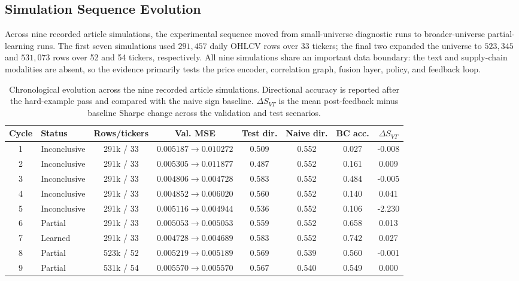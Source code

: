 \documentclass[10pt]{article}
\begin{document}
\subsection{Simulation Sequence Evolution}

Across nine recorded article simulations, the experimental sequence moved from small-universe
diagnostic runs to broader-universe partial-learning runs. The first seven simulations used
\(291{,}457\) daily OHLCV rows over 33 tickers; the final two expanded the universe to
\(523{,}345\) and \(531{,}073\) rows over 52 and 54 tickers, respectively. All nine
simulations share an important data boundary: the text and supply-chain modalities are absent,
so the evidence primarily tests the price encoder, correlation graph, fusion layer, policy,
and feedback loop.

\begin{table}[htbp]
	\centering
	\scriptsize
	\caption{Chronological evolution across the nine recorded article simulations. Directional
		accuracy is reported after the hard-example pass and compared with the naive sign baseline.
		\(\Delta S_{VT}\) is the mean post-feedback minus baseline Sharpe change across the validation
		and test scenarios.}
	\label{tab:simulation-evolution}
	\begin{tabular}{clcccccc}
		\toprule
		Cycle & Status & Rows/tickers & Val. MSE & Test dir. & Naive dir. & BC acc. & \(\Delta S_{VT}\) \\
		\midrule
		1 & Inconclusive & 291k / 33 & \(0.005187\to0.010272\) & 0.509 & 0.552 & 0.027 & -0.008 \\
		2 & Inconclusive & 291k / 33 & \(0.005305\to0.011877\) & 0.487 & 0.552 & 0.161 &  0.009 \\
		3 & Inconclusive & 291k / 33 & \(0.004806\to0.004728\) & 0.583 & 0.552 & 0.484 & -0.005 \\
		4 & Inconclusive & 291k / 33 & \(0.004852\to0.006020\) & 0.560 & 0.552 & 0.140 &  0.041 \\
		5 & Inconclusive & 291k / 33 & \(0.005116\to0.004944\) & 0.536 & 0.552 & 0.106 & -2.230 \\
		6 & Partial      & 291k / 33 & \(0.005053\to0.005053\) & 0.559 & 0.552 & 0.658 &  0.013 \\
		7 & Learned      & 291k / 33 & \(0.004728\to0.004689\) & 0.583 & 0.552 & 0.742 &  0.027 \\
		8 & Partial      & 523k / 52 & \(0.005219\to0.005189\) & 0.569 & 0.539 & 0.560 & -0.001 \\
		9 & Partial      & 531k / 54 & \(0.005570\to0.005570\) & 0.567 & 0.540 & 0.549 &  0.000 \\
		\bottomrule
	\end{tabular}
\end{table}
\end{document}
